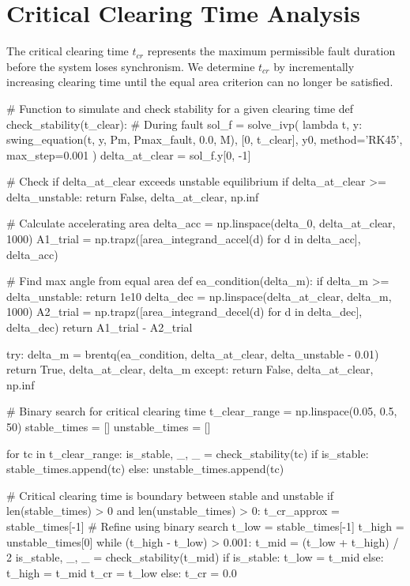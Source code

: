 \documentclass[11pt,a4paper]{article}
\begin{document}
\section{Critical Clearing Time Analysis}

The critical clearing time $t_{cr}$ represents the maximum permissible fault duration before the system loses synchronism. We determine $t_{cr}$ by incrementally increasing clearing time until the equal area criterion can no longer be satisfied.

\begin{pycode}
# Function to simulate and check stability for a given clearing time
def check_stability(t_clear):
    # During fault
    sol_f = solve_ivp(
        lambda t, y: swing_equation(t, y, Pm, Pmax_fault, 0.0, M),
        [0, t_clear], y0, method='RK45', max_step=0.001
    )
    delta_at_clear = sol_f.y[0, -1]

    # Check if delta_at_clear exceeds unstable equilibrium
    if delta_at_clear >= delta_unstable:
        return False, delta_at_clear, np.inf

    # Calculate accelerating area
    delta_acc = np.linspace(delta_0, delta_at_clear, 1000)
    A1_trial = np.trapz([area_integrand_accel(d) for d in delta_acc], delta_acc)

    # Find max angle from equal area
    def ea_condition(delta_m):
        if delta_m >= delta_unstable:
            return 1e10
        delta_dec = np.linspace(delta_at_clear, delta_m, 1000)
        A2_trial = np.trapz([area_integrand_decel(d) for d in delta_dec], delta_dec)
        return A1_trial - A2_trial

    try:
        delta_m = brentq(ea_condition, delta_at_clear, delta_unstable - 0.01)
        return True, delta_at_clear, delta_m
    except:
        return False, delta_at_clear, np.inf

# Binary search for critical clearing time
t_clear_range = np.linspace(0.05, 0.5, 50)
stable_times = []
unstable_times = []

for tc in t_clear_range:
    is_stable, _, _ = check_stability(tc)
    if is_stable:
        stable_times.append(tc)
    else:
        unstable_times.append(tc)

# Critical clearing time is boundary between stable and unstable
if len(stable_times) > 0 and len(unstable_times) > 0:
    t_cr_approx = stable_times[-1]
    # Refine using binary search
    t_low = stable_times[-1]
    t_high = unstable_times[0]
    while (t_high - t_low) > 0.001:
        t_mid = (t_low + t_high) / 2
        is_stable, _, _ = check_stability(t_mid)
        if is_stable:
            t_low = t_mid
        else:
            t_high = t_mid
    t_cr = t_low
else:
    t_cr = 0.0


\end{pycode}
\end{document}
